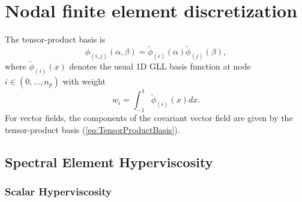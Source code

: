 \documentclass[gmdd, hvmath, online]{copernicus_discussions}
\begin{document}
\section{Nodal finite element discretization}

The tensor-product basis is
\begin{equation} \label{eq:TensorProductBasis}
\phi_{(i,j)}(\alpha, \beta) = \tilde{\phi}_{(i)}(\alpha) \tilde{\phi}_{(j)}(\beta),
\end{equation} where $\tilde{\phi}_{(i)}(x)$ denotes the usual 1D GLL basis function at node $i \in (0, \ldots, n_p)$ with weight
\begin{equation}
w_i = \int_{-1}^{1} \tilde{\phi}_{(i)}(x) dx.
\end{equation}  For vector fields, the components of the covariant vector field are given by the tensor-product basis (\ref{eq:TensorProductBasis}).

\subsection{Spectral Element Hyperviscosity}

\subsubsection{Scalar Hyperviscosity}
\end{document}
